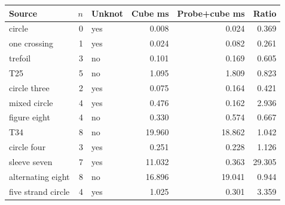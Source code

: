 \begin{tabular}{@{}lrlrrr@{}}
\toprule
Source & $n$ & Unknot & Cube ms & Probe+cube ms & Ratio \\
\midrule
circle & 0 & yes & 0.008 & 0.024 & 0.369 \\
one crossing & 1 & yes & 0.024 & 0.082 & 0.261 \\
trefoil & 3 & no & 0.101 & 0.169 & 0.605 \\
T25 & 5 & no & 1.095 & 1.809 & 0.823 \\
circle three & 2 & yes & 0.075 & 0.164 & 0.421 \\
mixed circle & 4 & yes & 0.476 & 0.162 & 2.936 \\
figure eight & 4 & no & 0.330 & 0.574 & 0.667 \\
T34 & 8 & no & 19.960 & 18.862 & 1.042 \\
circle four & 3 & yes & 0.251 & 0.228 & 1.126 \\
sleeve seven & 7 & yes & 11.032 & 0.363 & 29.305 \\
alternating eight & 8 & no & 16.896 & 19.041 & 0.944 \\
five strand circle & 4 & yes & 1.025 & 0.301 & 3.359 \\
\bottomrule
\end{tabular}
